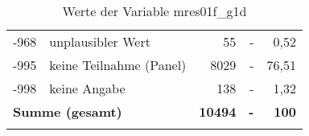 \begin{longtable}{Xlrrr}
       -968 & unplausibler Wert & 55 & - & 0,52 \\

       -995 & keine Teilnahme (Panel) & 8029 & - & 76,51 \\

       -998 & keine Angabe & 138 & - & 1,32 \\

     \midrule
     \multicolumn{2}{l}{\textbf{Summe (gesamt)}} & \textbf{10494} & \textbf{-} & \textbf{100} \\
     \bottomrule
     \caption{Werte der Variable mres01f\_g1d}
     \end{longtable}
     
